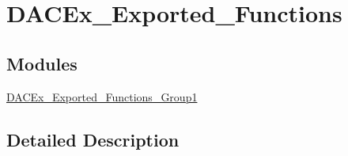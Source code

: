 \hypertarget{group___d_a_c_ex___exported___functions}{}\section{D\+A\+C\+Ex\+\_\+\+Exported\+\_\+\+Functions}
\label{group___d_a_c_ex___exported___functions}
\subsection*{Modules}
\begin{DoxyCompactItemize}
\item 
\mbox{\hyperlink{group___d_a_c_ex___exported___functions___group1}{D\+A\+C\+Ex\+\_\+\+Exported\+\_\+\+Functions\+\_\+\+Group1}}
\end{DoxyCompactItemize}


\subsection{Detailed Description}
